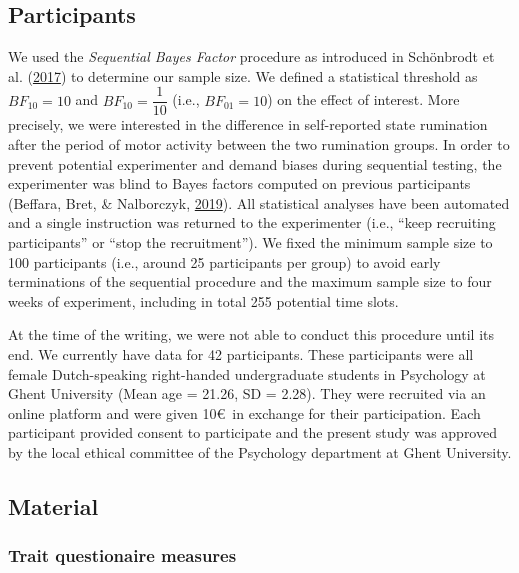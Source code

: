 \documentclass[a4paper,12pt,twoside,onecolumn,openright,final,oldfontcommands]{memoir}
\begin{document}
\hypertarget{participants-3}{%
\subsection{Participants}\label{participants-3}}

We used the \emph{Sequential Bayes Factor} procedure as introduced in Schönbrodt et al. (\protect\hyperlink{ref-schonbrodt_sequential_2017}{2017}) to determine our sample size. We defined a statistical threshold as \(BF_{10} = 10\) and \(BF_{10} = \dfrac{1}{10}\) (i.e., \(BF_{01} = 10\)) on the effect of interest. More precisely, we were interested in the difference in self-reported state rumination after the period of motor activity between the two rumination groups. In order to prevent potential experimenter and demand biases during sequential testing, the experimenter was blind to Bayes factors computed on previous participants (Beffara, Bret, \& Nalborczyk, \protect\hyperlink{ref-beffara_fully_2019}{2019}). All statistical analyses have been automated and a single instruction was returned to the experimenter (i.e., \enquote{keep recruiting participants} or \enquote{stop the recruitment}). We fixed the minimum sample size to 100 participants (i.e., around 25 participants per group) to avoid early terminations of the sequential procedure and the maximum sample size to four weeks of experiment, including in total 255 potential time slots.

At the time of the writing, we were not able to conduct this procedure until its end. We currently have data for 42 participants. These participants were all female Dutch-speaking right-handed undergraduate students in Psychology at Ghent University (Mean age = 21.26, SD = 2.28). They were recruited via an online platform and were given 10\euro~in exchange for their participation. Each participant provided consent to participate and the present study was approved by the local ethical committee of the Psychology department at Ghent University.

\hypertarget{material-4}{%
\subsection{Material}\label{material-4}}

\hypertarget{trait-questionaire-measures}{%
\subsubsection{Trait questionaire measures}\label{trait-questionaire-measures}}
\end{document}
